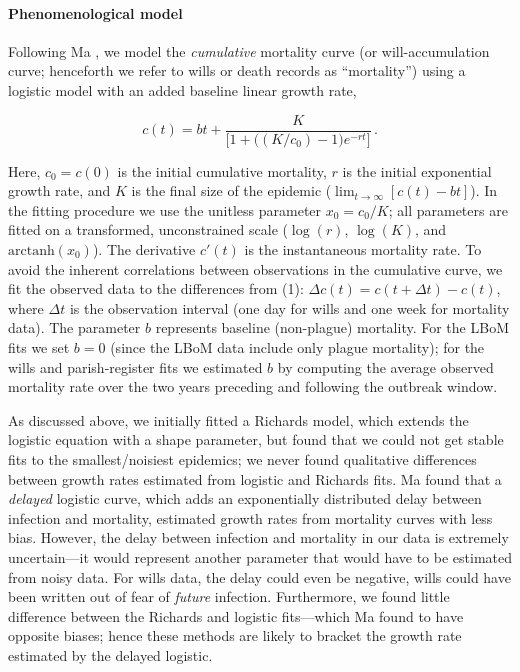 \hypertarget{phenmod}{}
\paragraph{Phenomenological model}

Following Ma \etal \cite{Ma+14}, we model the \emph{cumulative} mortality curve (or will-accumulation curve; henceforth we refer to wills or death records as ``mortality'') using a logistic model with an added baseline linear growth rate,
%
\begin{linenomath*}
\begin{equation}
c(t) = b t + \frac{K}{\big[1 + \big((K/c_0) - 1\big)e^{-rt}\big]} \,.
\label{E:Richards}
\end{equation}
\end{linenomath*}
%
Here, $c_0=c(0)$ is the initial cumulative mortality, $r$ is the initial exponential growth rate, and $K$ is the final size of the epidemic ($\lim_{t\to\infty}[c(t)-bt]$). In the fitting procedure we use the unitless parameter $x_0=c_0/K$; all parameters are fitted on a transformed, unconstrained scale (\ie $\log(r)$, $\log(K)$, and $\textrm{arctanh}(x_0)$). The derivative $c'(t)$ is the instantaneous mortality rate.  To avoid the inherent correlations between observations in the cumulative curve, we fit the observed data to the differences from (1): \mbox{$\Delta c(t) = c(t+\Delta t)-c(t)$}, where $\Delta t$ is the observation interval (one day for wills and one week for mortality data). The parameter $b$ represents baseline (non-plague) mortality. For the LBoM fits we set $b=0$ (since the LBoM data include only plague mortality); for the wills and parish-register fits we estimated $b$ by computing the average observed mortality rate over the two years preceding and following the outbreak window.

As discussed above, we initially fitted a Richards model, which extends the logistic equation with a shape parameter, but found that we could not get stable fits to the smallest/noisiest epidemics; we never found qualitative differences between growth rates estimated from logistic and Richards fits.  Ma \etal found that a \emph{delayed} logistic curve, which adds an exponentially distributed delay between infection and mortality, estimated growth rates from mortality curves with less bias. However, the delay between infection and mortality in our data is extremely uncertain---it would represent another parameter that would have to be estimated from noisy data. For wills data, the delay could even be negative, \ie wills could have been written out of fear of \emph{future} infection. Furthermore, we found little difference between the Richards and logistic fits---which Ma \etal found to have opposite biases; hence these methods are likely to bracket the growth rate estimated by the delayed logistic.

